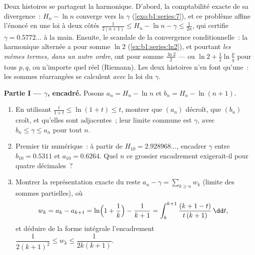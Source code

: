 \begin{problem}[{Devoir maison --- $H_n = \ln n + \gamma +
\frac{1}{2n} + O(n^{-2})$, et le réarrangement de $1 - \frac12 +
\frac13 - \dots$ en $\frac{\ln 2}{2}$}]
\label{pb:b1:series:1}
Deux histoires se partagent la  harmonique. D'abord, la
comptabilité exacte de sa divergence~: $H_n - \ln n$ converge vers la
 $\gamma$ (\cref{exo:b1:series:7}), et ce problème
affine l'énoncé en une loi à deux côtés $\frac{1}{2(n+1)}
\leq H_n - \ln n - \gamma \leq \frac{1}{2n}$, qui certifie $\gamma
= 0.5772\dots$ à la main. Ensuite, le scandale de la convergence
conditionnelle~: la  harmonique alternée a pour somme $\ln 2$
(\cref{ex:b1:series:ln2}), et pourtant \emph{les mêmes termes, dans
un autre ordre}, ont pour somme $\frac{\ln 2}{2}$ --- ou $\ln 2 +
\frac12\ln\frac pq$ pour tous $p, q$, ou n'importe quel réel
(Riemann). Les deux histoires n'en font qu'une~: les sommes
réarrangées se calculent \emph{avec} la loi du
$\gamma$.

\medskip
\noindent\textbf{Partie I --- $\gamma$, encadré.} Posons $a_n = H_n
- \ln n$ et $b_n = H_n - \ln(n+1)$.
\begin{enumerate}
  \item En utilisant $\frac{t}{1+t} \leq \ln(1 + t) \leq t$, montrer
        que $(a_n)$ décroît, que $(b_n)$ croît, et qu'elles sont
        adjacentes~; leur limite commune est $\gamma$, avec $b_n \leq
        \gamma \leq a_n$ pour tout $n$.
  \item Premier tir numérique~: à partir de $H_{10} = 2.928968\dots$,
        encadrer $\gamma$ entre $b_{10} = 0.5311$ et $a_{10} =
        0.6264$. Quel $n$ ce grossier encadrement exigerait-il pour
        quatre décimales~?
  \item Montrer la représentation exacte du reste $a_n - \gamma =
        \sum_{k \geq n} w_k$ (limite des sommes partielles), où
        \[
        w_k = a_k - a_{k+1}
        = \ln\Bigl(1 + \frac1k\Bigr) - \frac{1}{k+1}
        = \int_k^{k+1} \frac{(k + 1 - t)}{t\,(k+1)}\,\dd t ,
        \]
        et déduire de la forme intégrale l'encadrement
        $\dfrac{1}{2(k+1)^2} \leq w_k \leq \dfrac{1}{2k(k+1)}$.
\end{enumerate}


\end{problem}
